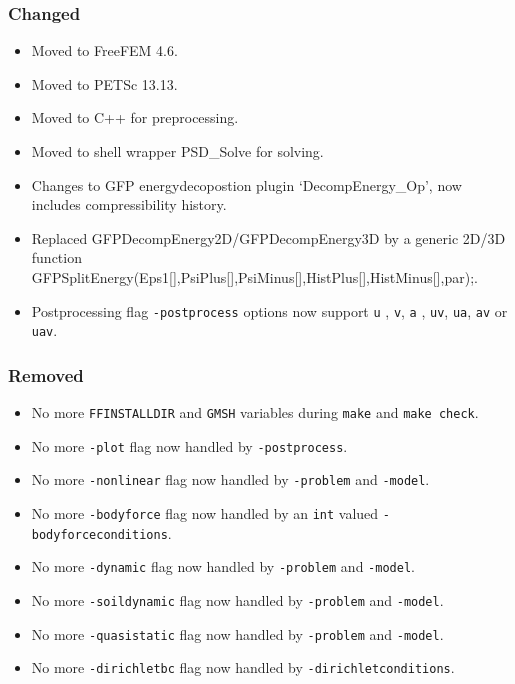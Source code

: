\subsubsection{Changed}

\begin{itemize}
\tightlist
\item
  Moved to FreeFEM 4.6.
\item
  Moved to PETSc 13.13.
\item
  Moved to C++ for preprocessing.
\item
  Moved to shell wrapper PSD\_Solve for solving.
\item
  Changes to GFP energydecopostion plugin `DecompEnergy\_Op', now
  includes compressibility history.
\item
  Replaced GFPDecompEnergy2D/GFPDecompEnergy3D by a generic 2D/3D
  function
  GFPSplitEnergy(Eps1{[}{]},PsiPlus{[}{]},PsiMinus{[}{]},HistPlus{[}{]},HistMinus{[}{]},par);.
\item
  Postprocessing flag \lstinline!-postprocess! options now support
  \lstinline!u! , \lstinline!v!, \lstinline!a! , \lstinline!uv!,
  \lstinline!ua!, \lstinline!av! or \lstinline!uav!.
\end{itemize}

\subsubsection{Removed}

\begin{itemize}
\tightlist
\item
  No more \lstinline!FFINSTALLDIR! and \lstinline!GMSH! variables during
  \lstinline!make! and \lstinline!make check!.
\item
  No more \lstinline!-plot! flag now handled by
  \lstinline!-postprocess!.
\item
  No more \lstinline!-nonlinear! flag now handled by
  \lstinline!-problem! and \lstinline!-model!.
\item
  No more \lstinline!-bodyforce! flag now handled by an \lstinline!int!
  valued \lstinline!-bodyforceconditions!.
\item
  No more \lstinline!-dynamic! flag now handled by \lstinline!-problem!
  and \lstinline!-model!.
\item
  No more \lstinline!-soildynamic! flag now handled by
  \lstinline!-problem! and \lstinline!-model!.
\item
  No more \lstinline!-quasistatic! flag now handled by
  \lstinline!-problem! and \lstinline!-model!.
\item
  No more \lstinline!-dirichletbc! flag now handled by
  \lstinline!-dirichletconditions!.
\end{itemize}

